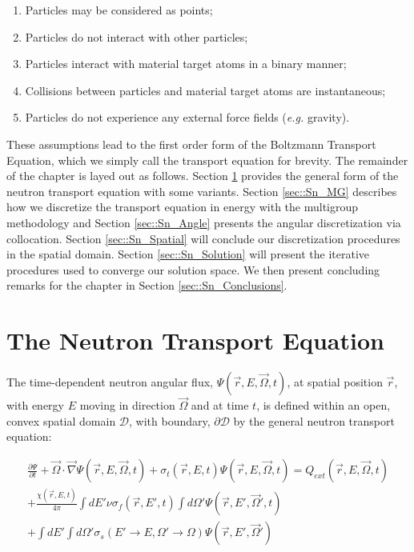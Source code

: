 \begin{enumerate}
	\item Particles may be considered as points;
	\item Particles do not interact with other particles;
	\item Particles interact with material target atoms in a binary manner;
	\item Collisions between particles and material target atoms are instantaneous;
	\item Particles do not experience any external force fields ({\em e.g.} gravity).
\end{enumerate}

These assumptions lead to the first order form of the Boltzmann Transport Equation, which we simply call the transport equation for brevity. The remainder of the chapter is layed out as follows. Section \ref{sec::Sn_neut} provides the general form of the neutron transport equation with some variants. Section \ref{sec::Sn_MG} describes how we discretize the transport equation in energy with the multigroup methodology and Section \ref{sec::Sn_Angle} presents the angular discretization via collocation. Section \ref{sec::Sn_Spatial} will conclude our discretization procedures in the spatial domain. Section \ref{sec::Sn_Solution} will present the iterative procedures used to converge our solution space. We then present concluding remarks for the chapter in Section \ref{sec::Sn_Conclusions}.

\section{The Neutron Transport Equation}
\label{sec::Sn_neut}

The time-dependent neutron angular flux, $\Psi (\vec{r}, E, \vec{\Omega}, t)$, at spatial position $\vec{r}$, with energy $E$ moving in direction $\vec{\Omega}$ and at time $t$, is defined within an open, convex spatial domain $\mathcal{D}$, with boundary, $\partial \mathcal{D}$ by the general neutron transport equation:


\begin{equation}
\label{eq::Sn_transport_eq_full}
\begin{aligned}
	\frac{\partial \Psi}{\partial t} + \vec{\Omega} \cdot \vec{\nabla} \Psi (\vec{r}, E, \vec{\Omega},t)+ \sigma_t (\vec{r}, E,t) \Psi (\vec{r}, E, \vec{\Omega},t) =Q_{ext} (\vec{r}, E, \vec{\Omega},t) \\
	+ \frac{\chi (\vec{r}, E,t)}{4 \pi} \int dE' \nu \sigma_f (\vec{r}, E',t) \int d\Omega' \Psi (\vec{r}, E', \vec{\Omega}',t) \\ 
	+ \int dE' \int d\Omega' \sigma_s (E' \rightarrow E, \Omega' \rightarrow \Omega) \Psi (\vec{r}, E', \vec{\Omega}')
\end{aligned}
\end{equation}

